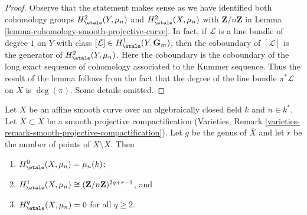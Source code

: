 \begin{proof}
Observe that the statement makes sense as we have identified both
cohomology groups $ H^2_\etale(Y, \mu_n)$ and $H^2_\etale(X, \mu_n)$
with $\mathbf{Z}/n\mathbf{Z}$ in
Lemma \ref{lemma-cohomology-smooth-projective-curve}.
In fact, if $\mathcal{L}$ is a line bundle of degree $1$
on $Y$ with class $[\mathcal{L}] \in H^1_\etale(Y, \mathbf{G}_m)$,
then the coboundary of $[\mathcal{L}]$ is the generator of
$H^2_\etale(Y, \mu_n)$. Here the coboundary is the coboundary
of the long exact sequence of cohomology associated to the Kummer
sequence. Thus the result of the lemma follows from the fact that
the degree of the line bundle $\pi^*\mathcal{L}$ on $X$ is $\deg(\pi)$.
Some details omitted.
\end{proof}

\begin{lemma}
\label{lemma-vanishing-cohomology-mu-smooth-curve}
Let $X$ be an affine smooth curve over an algebraically closed field $k$ and
$n \in k^*$. Let $X \subset \overline{X}$ be a smooth projective
compactification
(Varieties, Remark \ref{varieties-remark-smooth-projective-compactification}).
Let $g$ be the genus of $\overline{X}$ and let $r$ be the number of
points of $\overline{X} \setminus X$. Then
\begin{enumerate}
\item $H_\etale^0(X, \mu_n) = \mu_n(k)$;
\item $H_\etale^1(X, \mu_n) \cong (\mathbf{Z}/n\mathbf{Z})^{2g+r-1}$, and
\item $H_\etale^q(X, \mu_n) = 0$ for all $q \geq 2$.
\end{enumerate}
\end{lemma}

